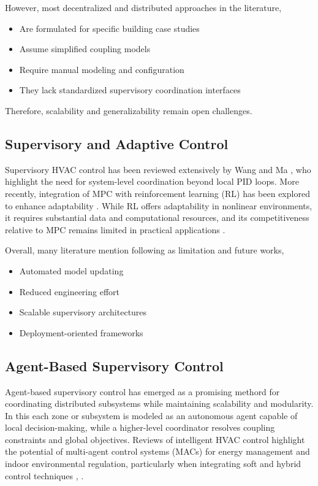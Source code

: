 \documentclass[twocolumn,11pt,a4paper]{article}
\begin{document}
However, most decentralized and distributed approaches in the literature,
\begin{itemize}
    \item Are formulated for specific building case studies
    \item Assume simplified coupling models
    \item Require manual modeling and configuration
    \item They lack standardized supervisory coordination interfaces
\end{itemize}
Therefore, scalability and generalizability remain open challenges.

\subsection{Supervisory and Adaptive Control}
Supervisory HVAC control has been reviewed extensively by Wang and Ma \cite{wangSupervisoryOptimalControl2008}, who highlight the need for system-level coordination beyond local PID loops. More recently, integration of MPC with reinforcement learning (RL) has been explored to enhance adaptability \cite{balaliEnergyModellingControl2023}. While RL offers adaptability in nonlinear environments, it requires substantial data and computational resources, and its competitiveness relative to MPC remains limited in practical applications \cite{balaliEnergyModellingControl2023}.

Overall, many literature mention following as limitation and future works, 
\begin{itemize}
    \item Automated model updating
    \item Reduced engineering effort
    \item Scalable supervisory architectures
    \item Deployment-oriented frameworks
\end{itemize}

\subsection{Agent-Based Supervisory Control}
Agent-based supervisory control has emerged as a promising methord for coordinating distributed subsystems while maintaining scalability and modularity. In this each zone or subsystem is modeled as an autonomous agent capable of local decision-making, while a higher-level coordinator resolves coupling constraints and global objectives. Reviews of intelligent HVAC control highlight the potential of multi-agent control systems (MACs) for energy management and indoor environmental regulation, particularly when integrating soft and hybrid control techniques \cite{naiduAdvancedControlStrategies2011}, \cite{dounisAdvancedControlSystems2009}.
\end{document}
